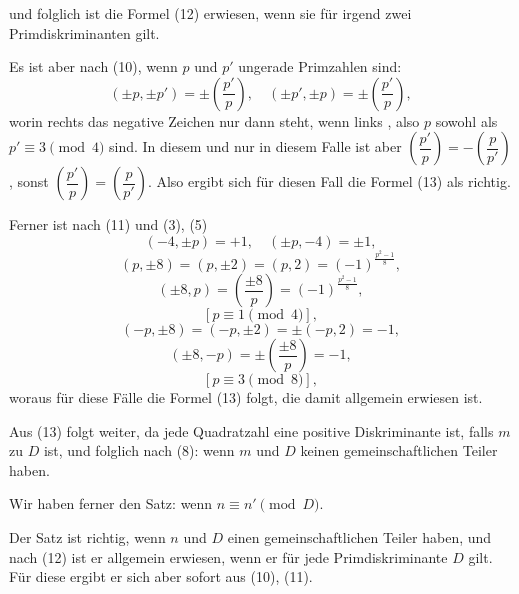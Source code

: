und folglich ist die Formel (12) erwiesen, wenn sie für irgend zwei Primdiskriminanten gilt.

Es ist aber nach (10), wenn $p$ und $p'$ ungerade Primzahlen sind:
\[
(\pm p, \pm p') = \pm\left(\frac{p'}{p}\right), \quad (\pm p', \pm p) = \pm\left(\frac{p'}{p}\right), %
\]
worin rechts das negative Zeichen nur dann steht, wenn links , also $p$ sowohl als $p' \equiv 3 \pmod{4}$ sind. In diesem und nur in diesem Falle ist aber $\left(\dfrac{p'}{p}\right) = -\left(\dfrac{p}{p'}\right)$, sonst $\left(\dfrac{p'}{p}\right) = \left(\dfrac{p}{p'}\right)$. Also ergibt sich für diesen Fall die Formel (13) als richtig.

Ferner ist nach (11) und (3), (5)
\[
(-4, \pm p) = +1, \quad (\pm p, -4) = \pm 1,
\]
\[
(p, \pm 8) = (p, \pm 2) = (p, 2) = (-1)^{\frac{p^2-1}{8}},
\]
\[
(\pm 8, p) = \left(\frac{\pm 8}{p}\right) = (-1)^{\frac{p^2-1}{8}},
\]
\[
[p \equiv 1 \pmod{4}],
\]
\[
(-p, \pm 8) = (-p, \pm 2) = \pm(-p, 2) = -1,
\]
\[
(\pm 8, -p) = \pm\left(\frac{\pm 8}{p}\right) = -1,
\]
\[
[p \equiv 3 \pmod{8}],
\]
woraus für diese Fälle die Formel (13) folgt, die damit allgemein erwiesen ist.

Aus (13) folgt weiter, da jede Quadratzahl eine positive Diskriminante ist, falls $m$ zu $D$  ist,
und folglich nach (8):
wenn $m$ und $D$ keinen gemeinschaftlichen Teiler haben.

Wir haben ferner den Satz:
wenn $n \equiv n' \pmod{D}$.

Der Satz ist richtig, wenn $n$ und $D$ einen gemeinschaftlichen Teiler haben, und nach (12) ist er allgemein erwiesen, wenn er für jede Primdiskriminante $D$ gilt. Für diese ergibt er sich aber sofort aus (10), (11).
